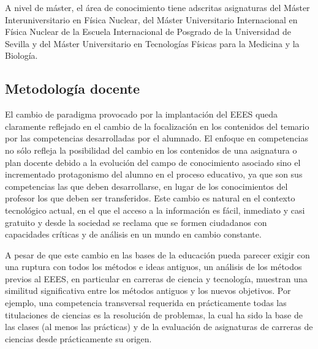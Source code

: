 \documentclass[a4paper,12pt,twoside]{article}
\begin{document}
A nivel de máster, el área de conocimiento tiene adscritas asignaturas del Máster Interuniversitario en Física Nuclear, del Máster Universitario Internacional en Física Nuclear de la Escuela Internacional de Posgrado de la Universidad de Sevilla y del Máster Universitario en Tecnologías Físicas para la Medicina y la Biología.

\subsection{Metodología docente}

El cambio de paradigma provocado por la implantación del EEES queda claramente reflejado en el cambio de la focalización en los contenidos del temario por las competencias desarrolladas por el alumnado. El enfoque en competencias no sólo refleja la posibilidad del cambio en los contenidos de una asignatura o plan docente debido a la evolución del campo de conocimiento asociado sino el incrementado protagonismo del alumno en el proceso educativo, ya que son sus competencias las que deben desarrollarse, en lugar de los conocimientos del profesor los que deben ser transferidos. Este cambio es natural en el contexto tecnológico actual, en el que el acceso a la información es fácil, inmediato y casi gratuito y desde la sociedad se reclama que se formen ciudadanos con capacidades críticas y de análisis en un mundo en cambio constante.

A pesar de que este cambio en las bases de la educación pueda parecer exigir con una ruptura con todos los métodos e ideas antiguos, un análisis de los métodos previos al EEES, en particular en carreras de ciencia y tecnología, muestran una similitud significativa entre los métodos antiguos y los nuevos objetivos. Por ejemplo, una competencia transversal requerida en prácticamente todas las titulaciones de ciencias es la resolución de problemas, la cual ha sido la base de las clases (al menos las prácticas) y de la evaluación de asignaturas de carreras de ciencias desde prácticamente su origen. 
\end{document}
